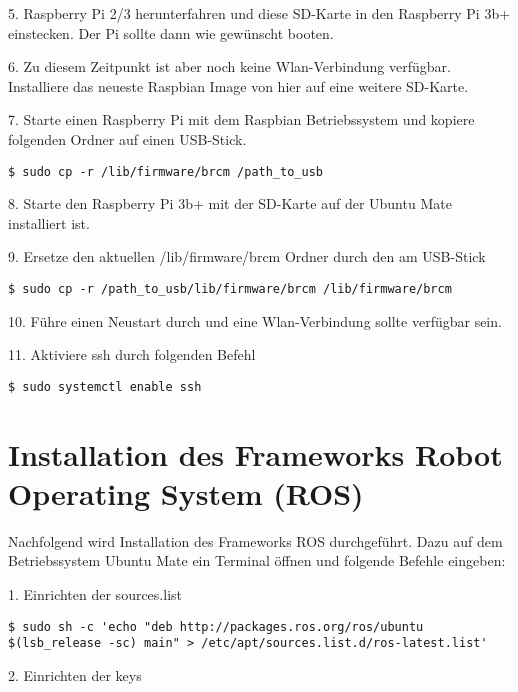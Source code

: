 5. Raspberry Pi 2/3 herunterfahren und diese SD-Karte in den Raspberry Pi 3b+ einstecken. Der Pi sollte dann wie gewünscht booten. 

6. Zu diesem Zeitpunkt ist aber noch keine Wlan-Verbindung verfügbar. Installiere das neueste Raspbian Image von hier auf eine weitere SD-Karte. 

7. Starte einen Raspberry Pi mit dem Raspbian Betriebssystem und kopiere folgenden Ordner auf einen USB-Stick.\\

\begin{lstlisting}
$ sudo cp -r /lib/firmware/brcm /path_to_usb
\end{lstlisting}

8. Starte den Raspberry Pi 3b+ mit der SD-Karte auf der Ubuntu Mate installiert ist. 

9. Ersetze den aktuellen /lib/firmware/brcm Ordner durch den am USB-Stick\\

\begin{lstlisting}
$ sudo cp -r /path_to_usb/lib/firmware/brcm /lib/firmware/brcm
\end{lstlisting}

10. Führe einen Neustart durch und eine Wlan-Verbindung sollte verfügbar sein.

11. Aktiviere ssh durch folgenden Befehl\\

\begin{lstlisting}
$ sudo systemctl enable ssh
\end{lstlisting}


\section{Installation des Frameworks Robot Operating System (ROS)}

Nachfolgend wird Installation des Frameworks ROS durchgeführt. Dazu auf dem Betriebssystem Ubuntu Mate ein Terminal öffnen und folgende Befehle eingeben:

1. Einrichten der sources.list\\

\begin{lstlisting}
$ sudo sh -c 'echo "deb http://packages.ros.org/ros/ubuntu $(lsb_release -sc) main" > /etc/apt/sources.list.d/ros-latest.list'
\end{lstlisting}

2. Einrichten der keys\\


